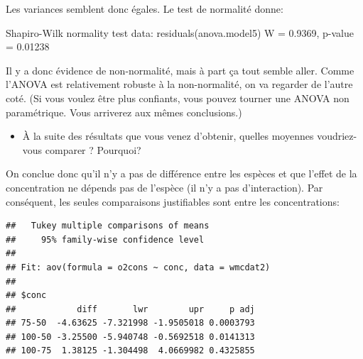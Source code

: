 \documentclass[12pt,]{book}
\newenvironment{Shaded}{\begin{snugshade}}{\end{snugshade}}
\newcommand{\CommentTok}[1]{\textcolor[rgb]{0.37,0.37,0.37}{\textit{#1}}}
\newcommand{\DataTypeTok}[1]{\textcolor[rgb]{0.27,0.27,0.27}{#1}}
\newcommand{\KeywordTok}[1]{\textcolor[rgb]{0.27,0.27,0.27}{\textbf{#1}}}
\newcommand{\NormalTok}[1]{#1}
\newcommand{\OperatorTok}[1]{\textcolor[rgb]{0.43,0.43,0.43}{\textbf{#1}}}
\newcommand{\StringTok}[1]{\textcolor[rgb]{0.5,0.5,0.5}{#1}}
\providecommand{\tightlist}{%
  \setlength{\itemsep}{0pt}\setlength{\parskip}{0pt}}
\begin{document}
Les variances semblent donc égales. Le test de normalité donne:

Shapiro-Wilk normality test
data: residuals(anova.model5)
W = 0.9369, p-value = 0.01238

Il y a donc évidence de non-normalité, mais à part ça tout semble aller. Comme l'ANOVA est relativement robuste à la non-normalité, on va regarder de l'autre coté. (Si vous voulez être plus confiants, vous pouvez tourner une ANOVA non paramétrique. Vous arriverez aux mêmes conclusions.)

\begin{itemize}
\tightlist
\item
  À la suite des résultats que vous venez d'obtenir, quelles moyennes voudriez-vous comparer ? Pourquoi?
\end{itemize}

On conclue donc qu'il n'y a pas de différence entre les espèces et que l'effet de la concentration ne dépends pas de l'espèce (il n'y a pas d'interaction). Par conséquent, les seules comparaisons justifiables sont entre les concentrations:

\begin{Shaded}
\end{Shaded}

\begin{verbatim}
##   Tukey multiple comparisons of means
##     95% family-wise confidence level
## 
## Fit: aov(formula = o2cons ~ conc, data = wmcdat2)
## 
## $conc
##            diff       lwr        upr     p adj
## 75-50  -4.63625 -7.321998 -1.9505018 0.0003793
## 100-50 -3.25500 -5.940748 -0.5692518 0.0141313
## 100-75  1.38125 -1.304498  4.0669982 0.4325855
\end{verbatim}
\end{document}
